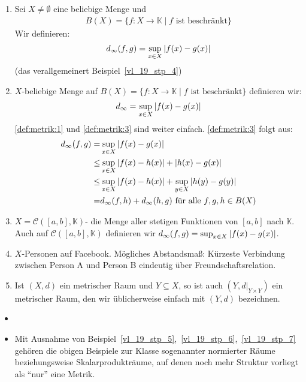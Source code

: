 \begin{Beispiel}
{\begin{enumerate}
		\item Sei $X \neq \emptyset$ eine beliebige Menge und 
		\begin{align*}
			B(X) = \{f: X \rightarrow \mathbb{K}\mid f \text{ ist beschränkt}\}
		\end{align*}
		Wir definieren:
		\begin{align*}
			d_\infty (f,g) = \sup_{x \in X} \abs{f(x)- g(x)}
		\end{align*}
		(das verallgemeinert Beispiel~\ref{vl_19_stp_4})
		\item $X$-beliebige Menge auf $B(X) =\{f: X \rightarrow \mathbb{K}\mid f 
		\text{ ist beschränkt}\}$ definieren wir:
		\begin{align*}
			d_\infty = \sup_{x \in X} \abs{f(x) -g(x)}
		\end{align*}
		\ref{def:metrik:1} und \ref{def:metrik:3} sind weiter einfach. 
		\ref{def:metrik:3} folgt aus: 
		\begin{align*}
			d_\infty (f,g) = & \sup_{x \in X} \abs{ f(x) -g(x)} \\
			\leq &\sup_{x \in X} \abs{f(x)-h(x)}+\abs{h(x)-g(x)}  \\
			\leq &  \sup_{x \in X}\abs{f(x)-h(x)} + \sup_{y \in X}\abs{h(y)-g(y)} \\
			= & d_\infty (f,h) + d_\infty (h,g) \text{ für alle } f,g,h \in B(X) 
		\end{align*}
		\item $X = \mathcal{C}([a,b], \mathbb{K})$- die Menge aller stetigen Funktionen 
		von $[a,b]$ nach $\mathbb{K}$. Auch auf $\mathcal{C}([a,b], \mathbb{K})$ 
		definieren wir $d_\infty(f,g) = \sup_{x \in X} \abs{f(x)-g(x)}$.
		\item \label{vl_19_stp_6}  $X$-Personen auf Facebook.
		Mögliches Abstandsmaß: Kürzeste Verbindung zwischen Person A und Person B eindeutig 
		über Freundschaftsrelation. 
		\item \label{vl_19_stp_7} Ist $(X,d)$ ein metrischer Raum und $Y \subseteq X$, so ist auch 
		$(Y, d\vert_{Y \times Y})$ ein metrischer Raum, den wir üblicherweise einfach 
		mit $(Y,d)$ bezeichnen.
	\end{enumerate}
}\end{Beispiel}

\begin{Bemerkung}{
	\begin{itemize}
		\item[ ]
		\item Mit Ausnahme von Beispiel~\ref{vl_19_stp_5},~\ref{vl_19_stp_6},~\ref{vl_19_stp_7} gehören die obigen Beispiele zur 
		Klasse sogenannter normierter Räume beziehungsweise Skalarprodukträume, 
		auf denen noch mehr Struktur vorliegt als \enquote{nur} eine Metrik.
	\end{itemize}
}\end{Bemerkung}
